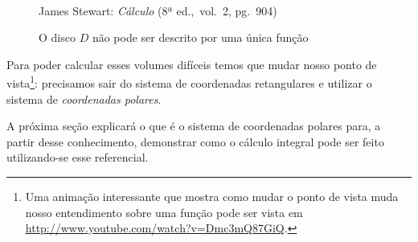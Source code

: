 \begin{figure}[H]
  \begin{center}
    \caption{O disco $D$ não pode ser descrito por uma única função}
    \label{fig:voldif2}
    \\
    \footnotesize{James Stewart: \emph{Cálculo} (8ª ed.,\ vol.\ 2,
      pg.\ 904)}
  \end{center}
\end{figure}

Para poder calcular esses volumes difíceis temos que mudar nosso ponto
de vista\footnote{Uma animação interessante que mostra como mudar o
  ponto de vista muda nosso entendimento sobre uma função pode ser
  vista em \url{http://www.youtube.com/watch?v=Dmc3mQ87GiQ}.}:
precisamos sair do sistema de coordenadas retangulares e
utilizar o sistema de \emph{coordenadas polares}.

A próxima seção explicará o que é o sistema de coordenadas polares
para, a partir desse conhecimento, demonstrar como o cálculo integral
pode ser feito utilizando-se esse referencial.
